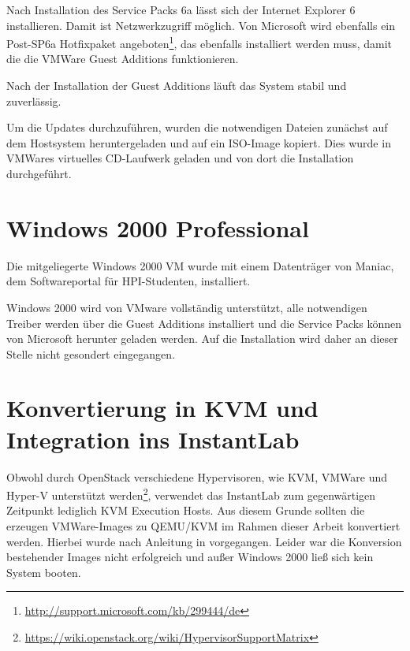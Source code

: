 	Nach Installation des Service Packs 6a lässt sich der Internet Explorer 6 installieren.
	Damit ist Netzwerkzugriff möglich. 
	Von Microsoft wird ebenfalls ein Post-SP6a Hotfixpaket angeboten\footnote{\url{http://support.microsoft.com/kb/299444/de}}, das ebenfalls installiert werden muss, damit die die VMWare Guest Additions funktionieren.


	Nach der Installation der Guest Additions läuft das System stabil und zuverlässig. 

	Um die Updates durchzuführen, wurden die notwendigen Dateien zunächst auf dem Hostsystem heruntergeladen und auf ein ISO-Image kopiert. Dies wurde in VMWares virtuelles CD-Laufwerk geladen und von dort die Installation durchgeführt.

\section{Windows 2000 Professional}

	Die mitgeliegerte Windows 2000 VM wurde mit einem Datenträger von Maniac, dem Softwareportal für HPI-Studenten, installiert.

	Windows 2000 wird von VMware vollständig unterstützt, alle notwendigen Treiber werden über die Guest Additions installiert und die Service Packs können von Microsoft herunter geladen werden.
	Auf die Installation wird daher an dieser Stelle nicht gesondert eingegangen.



\section{Konvertierung in KVM und Integration ins InstantLab}

	Obwohl durch OpenStack verschiedene Hypervisoren, wie KVM, VMWare und Hyper-V unterstützt werden\footnote{\url{https://wiki.openstack.org/wiki/HypervisorSupportMatrix}},
	verwendet das InstantLab zum gegenwärtigen Zeitpunkt lediglich KVM Execution Hosts.
	Aus diesem Grunde sollten die erzeugen VMWare-Images zu QEMU/KVM im Rahmen dieser Arbeit konvertiert werden.
	Hierbei wurde nach Anleitung in \cite{VMVDiskMan} vorgegangen. 
	Leider war die Konversion bestehender Images nicht erfolgreich und außer Windows 2000 ließ sich kein System booten.


